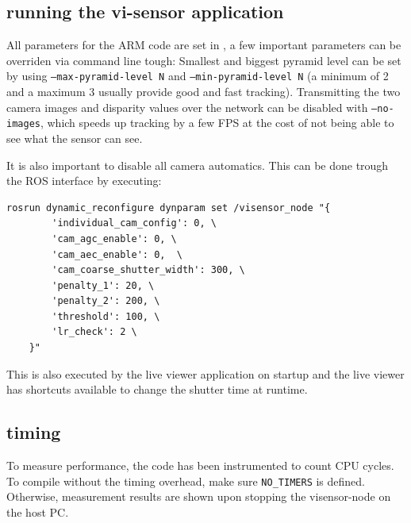 \subsection{running the vi-sensor application}

All parameters for the ARM code are set in ,
a few important parameters can be overriden via command line tough: Smallest
and biggest pyramid level can be set by using \texttt{--max-pyramid-level N}
and \texttt{--min-pyramid-level N} (a minimum of 2 and a maximum 3 usually
provide good and fast tracking). Transmitting the two camera images and
disparity values over the network can be disabled with \texttt{--no-images},
which speeds up tracking by a few FPS at the cost of not being able to see what
the sensor can see.

It is also important to disable all camera automatics. This can be done trough
the ROS interface by executing:

\begin{verbatim}
rosrun dynamic_reconfigure dynparam set /visensor_node "{
        'individual_cam_config': 0, \
        'cam_agc_enable': 0, \
        'cam_aec_enable': 0,  \
        'cam_coarse_shutter_width': 300, \
        'penalty_1': 20, \
        'penalty_2': 200, \
        'threshold': 100, \
        'lr_check': 2 \
    }"
\end{verbatim}

This is also executed by the live viewer application on startup and the live
viewer has shortcuts available to change the shutter time at runtime.

\subsection{timing}

To measure performance, the code has been instrumented to count CPU cycles. To
compile without the timing overhead, make sure \texttt{NO\_TIMERS} is defined.
Otherwise, measurement results are shown upon stopping the visensor-node on the
host PC.
